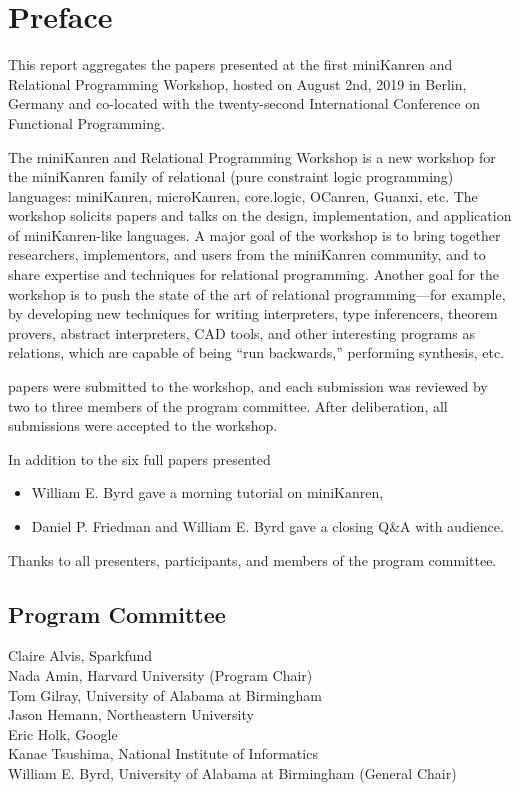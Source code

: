 \documentclass[a4paper]{book}
\date{August 22, 2019}
\author{William E. Byrd \and Nada Amin}
\begin{document}
\frontmatter
\setcounter{page}{3}  %
\chapter*{Preface}
This report aggregates the papers presented at the first miniKanren
and Relational Programming Workshop, hosted on August 2nd, 2019 in
Berlin, Germany and co-located with the twenty-second International
Conference on Functional Programming.

\vspace{5pt}
\noindent
The miniKanren and Relational Programming Workshop is a new workshop for the miniKanren family of relational (pure constraint logic programming) languages: miniKanren, microKanren, core.logic, OCanren, Guanxi, etc. The workshop solicits papers and talks on the design, implementation, and application of miniKanren-like languages. A major goal of the workshop is to bring together researchers, implementors, and users from the miniKanren community, and to share expertise and techniques for relational programming. Another goal for the workshop is to push the state of the art of relational programming—for example, by developing new techniques for writing interpreters, type inferencers, theorem provers, abstract interpreters, CAD tools, and other interesting programs as relations, which are capable of being “run backwards,” performing synthesis, etc.

\vspace{5pt}
 papers were submitted to the workshop, and each submission was reviewed by
two to three members of the program committee.  After deliberation, all submissions
were accepted to the workshop.

\vspace{5pt}
\noindent
In addition to the six full papers  presented
\begin{itemize}
\item William E. Byrd gave a morning tutorial on miniKanren,
\item Daniel P. Friedman and William E. Byrd gave a closing Q\&A with audience.
\end{itemize}

\vspace{5pt}
\noindent
Thanks to all presenters, participants, and members of the
program committee.

\section*{Program Committee}
\noindent
Claire Alvis, Sparkfund\\
Nada Amin, Harvard University (Program Chair)\\
Tom Gilray, University of Alabama at Birmingham\\
Jason Hemann, Northeastern University\\
Eric Holk, Google\\
Kanae Tsushima, National Institute of Informatics\\
William E. Byrd, University of Alabama at Birmingham (General Chair)\\
\end{document}
